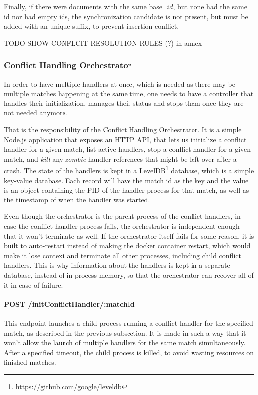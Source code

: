 Finally, if there were documents with the same base $\_id$, but none had the same id nor had empty ids, the synchronization candidate is not present, but must be added with an unique suffix, to prevent insertion conflict.


{\Huge TODO SHOW CONFLCIT RESOLUTION RULES (?)  in annex}


\subsubsection{Conflict Handling Orchestrator}

In order to have multiple handlers at once, which is needed as there may be multiple matches happening at the same time, one needs to have a controller that handles their initialization, manages their status and stops them once they are not needed anymore.

That is the responsibility of the Conflict Handling Orchestrator. It is a simple Node.js application that exposes an HTTP API, that lets us initialize a conflict handler for a given match, list active handlers, stop a conflict handler for a given match, and \textit{kill} any \textit{zombie} handler references that might be left over after a crash. The state of the handlers is kept in a LevelDB\footnote{https://github.com/google/leveldb} database, which is a simple key-value database. Each record will have the match id as the key and the value is an object containing the PID of the handler process for that match, as well as the timestamp of when the handler was started.

Even though the orchestrator is the parent process of the conflict handlers, in case the conflict handler process fails, the orchestrator is independent enough that it won't terminate as well. If the orchestrator itself fails for some reason, it is built to auto-restart instead of making the docker container restart, which would make it lose context and terminate all other processes, including child conflict handlers. This is why information about the handlers is kept in a separate database, instead of in-process memory, so that the orchestrator can recover all of it in case of failure.

\paragraph{POST /initConflictHandler/:matchId}
This endpoint launches a child process running a conflict handler for the specified match, as described in the previous subsection. It is made in such a way that it won't allow the launch of multiple handlers for the same match simultaneously. After a specified timeout, the child process is killed, to avoid wasting resources on finished matches.

